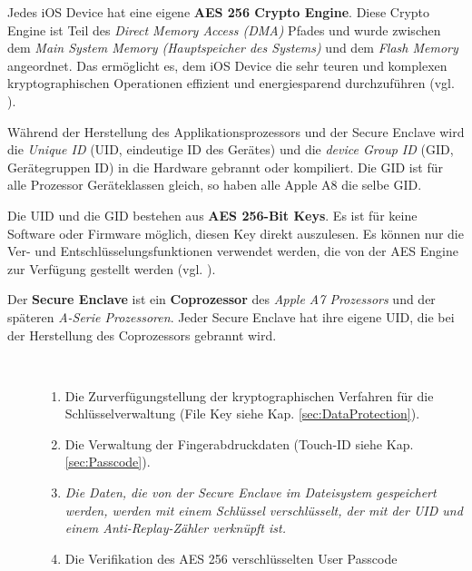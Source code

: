 Jedes iOS Device hat eine eigene \textbf{AES 256 Crypto Engine}. Diese Crypto Engine ist Teil des \textit{\glqq Direct Memory Access (DMA)\grqq{}} Pfades und wurde zwischen dem \textit{\glqq Main System Memory (Hauptspeicher des Systems)\grqq{}} und dem \textit{\glqq Flash Memory\grqq{}} angeordnet. Das ermöglicht es, dem iOS Device die sehr teuren und komplexen kryptographischen Operationen effizient und energiesparend durchzuführen (vgl. \cite{iOSSec[5], iOSSec[2],iOSSec[1], Apple[4], Apple[5], Apple[6], Apple[3]}). \par 
Während der Herstellung des Applikationsprozessors und der Secure Enclave wird die \textit{\glqq Unique ID\grqq{}} (UID, eindeutige ID des Gerätes) und die \textit{\glqq device Group ID\grqq{}} (GID, Gerätegruppen ID) in die Hardware gebrannt oder kompiliert. Die GID ist für alle Prozessor Geräteklassen gleich, so haben alle Apple A8 die selbe GID. \par 
Die UID und die GID bestehen aus \textbf{AES 256-Bit Keys}. Es ist für keine Software oder Firmware möglich, diesen Key direkt auszulesen. Es können nur die Ver- und Entschlüsselungsfunktionen verwendet werden, die von der AES Engine zur Verfügung gestellt werden (vgl. \cite{iOSSec[5], iOSSec[2],iOSSec[1], Apple[4], Apple[5], Apple[6], Apple[3]}).

Der \textbf{Secure Enclave} ist ein \textbf{Coprozessor} des \textit{\glqq Apple A7 Prozessors\grqq{}} und der späteren \textit{\glqq A-Serie Prozessoren\grqq}. Jeder Secure Enclave hat ihre eigene UID, die bei der Herstellung des Coprozessors gebrannt wird.

\begin{description}
     \item[\parbox{\textwidth} {Die Secure Enclave hat folgende Aufgaben}]~\par
    \begin{enumerate}
        \item Die Zurverfügungstellung der kryptographischen Verfahren für die Schlüsselverwaltung (File Key siehe Kap. \ref{sec:DataProtection}).
       \item Die Verwaltung der Fingerabdruckdaten (Touch-ID siehe Kap. \ref{sec:Passcode}).
       \item \textit{\glqq Die Daten, die von der Secure Enclave im Dateisystem gespeichert werden, werden mit einem Schlüssel verschlüsselt, der mit der UID und einem Anti-Replay-Zähler verknüpft ist.\grqq{}} \cite{Apple[8]}
       \item Die Verifikation des AES 256 verschlüsselten User Passcode
    \end{enumerate}   
\end{description} 

